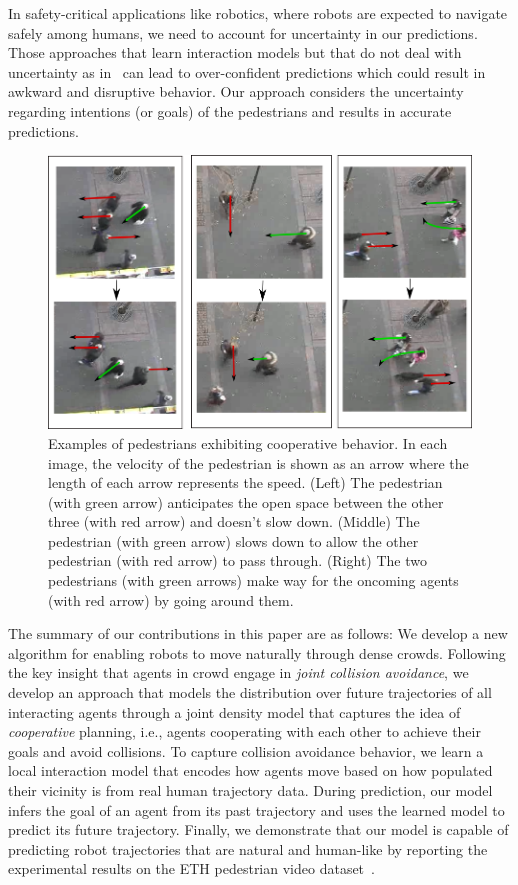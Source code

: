 In safety-critical applications like robotics, where robots are
expected to navigate safely among humans, we need to account for
uncertainty in our predictions. Those approaches that learn
interaction models but that do not deal with uncertainty as
in~\cite{alahi16} can lead to over-confident predictions which could
result in awkward and disruptive behavior. Our approach considers the
uncertainty regarding intentions (or goals) of the pedestrians and
results in accurate predictions.

\begin{figure}[t!]
  \centering
  \includegraphics[width=\linewidth]{Figures/drawing-horizontal.png}
  \caption{Examples of pedestrians exhibiting cooperative behavior. In
    each image, the velocity of the pedestrian is shown as an arrow
    where the length of each arrow represents the speed. (Left) The
    pedestrian (with green arrow) anticipates the open space between
    the other three (with red arrow) and doesn't slow down. (Middle)
    The pedestrian (with green arrow) slows down to allow the other
    pedestrian (with red arrow) to pass through. (Right) The two
    pedestrians (with green arrows) make way for the oncoming agents
    (with red arrow) by going around them.}
  \label{fig:oigp-intro}
  \vspace{-15pt}
\end{figure}




The summary of our contributions in this paper are as follows: We
develop a new algorithm for enabling robots to move naturally through
dense crowds.
Following the key insight that agents in crowd engage in \textit{joint
  collision avoidance}, we develop an approach that models the
distribution over future trajectories of all interacting agents
through a joint density model that captures the idea of
\textit{cooperative} planning, i.e., agents cooperating with each
other to achieve their goals and avoid collisions.  To capture
collision avoidance behavior, we learn a local interaction model that
encodes how agents move based on how populated their vicinity is from
real human trajectory data.  During prediction, our model infers the
goal of an agent from its past trajectory and uses the learned model
to predict its future trajectory.  Finally, we demonstrate that our
model is capable of predicting robot trajectories that are natural and
human-like by reporting the experimental results on the ETH pedestrian
video dataset~\cite{pellegrini09}.

